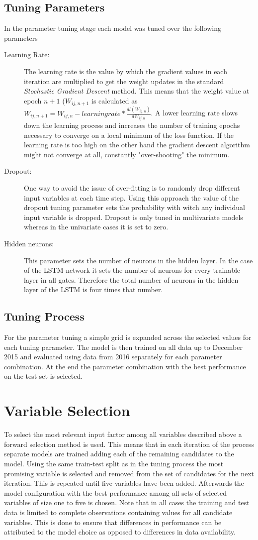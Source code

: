 \subsection{Tuning Parameters}
In the parameter tuning stage each model was tuned over the following parameters
\begin{description}
\item[Learning Rate:] The learning rate is the value by which the gradient values in each iteration are multiplied to get the weight updates in the standard \textit{Stochastic Gradient Descent} method. This means that the weight value at epoch $n+1$ ($W_{ij, n+1}$ is calculated as $W_{ij, n+1} = W_{ij, n} - learningrate * \frac{dl(W_{ij, n})}{dW_{ij, n}}$. A lower learning rate slows down the learning process and increases the number of training epochs necessary to converge on a local minimum of the loss function. If the learning rate is too high on the other hand the gradient descent algorithm might not converge at all, constantly "over-shooting" the minimum.
\item[Dropout:] One way to avoid the issue of over-fitting is to randomly drop different input variables at each time step. Using this approach the value of the dropout tuning parameter sets the probability with witch any individual input variable is dropped. Dropout is only tuned in multivariate models whereas in the univariate cases it is set to zero.
\item[Hidden neurons:] This parameter sets the number of neurons in the hidden layer. In the case of the LSTM network it sets the number of neurons for every trainable layer in all gates. Therefore the total number of neurons in the hidden layer of the LSTM is four times that number.
\end{description}
\subsection{Tuning Process}
For the parameter tuning a simple grid is expanded across the selected values for each tuning parameter. The model is then trained on all data up to December 2015 and evaluated using data from 2016 separately for each parameter combination. At the end the parameter combination with the best performance on the test set is selected.
\section{Variable Selection}
To select the most relevant input factor among all variables described above a forward selection method is used. This means that in each iteration of the process separate models are trained adding each of the remaining candidates to the model. Using the same train-test split as in the tuning process the most promising variable is  selected and removed from the set of candidates for the next iteration. This is repeated until five variables have been added. Afterwards the model configuration with the best performance among all sets of selected variables of size one to five is chosen. Note that in all cases the training and test data is limited to complete observations containing values for all candidate variables. This is done to ensure that differences in performance can be attributed to the model choice as opposed to differences in data availability.
